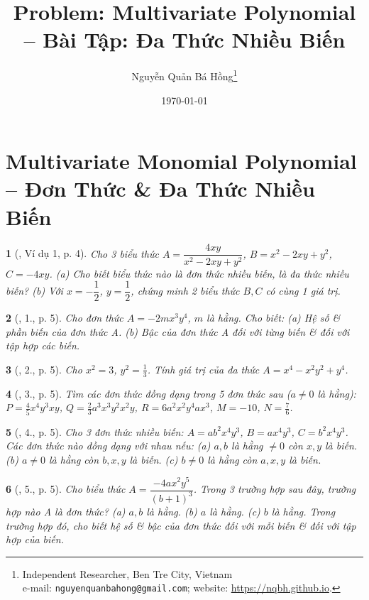 \documentclass{article}
\title{Problem: Multivariate Polynomial -- Bài Tập: Đa Thức Nhiều Biến}
\author{Nguyễn Quản Bá Hồng\footnote{Independent Researcher, Ben Tre City, Vietnam\\e-mail: \texttt{nguyenquanbahong@gmail.com}; website: \url{https://nqbh.github.io}.}}
\date{\today}
\newtheorem{baitoan}{}
\begin{document}
\maketitle
\tableofcontents


\section{Multivariate Monomial Polynomial -- Đơn Thức \& Đa Thức Nhiều Biến}

\begin{baitoan}[\cite{Tuyen_Toan_8}, Ví dụ 1, p. 4]
	Cho 3 biểu thức $A = \dfrac{4xy}{x^2 - 2xy + y^2}$, $B = x^2 - 2xy + y^2$, $C = -4xy$. (a) Cho biết biểu thức nào là đơn thức nhiều biến, là đa thức nhiều biến? (b) Với $x = -\dfrac{1}{2}$, $y = \dfrac{1}{2}$, chứng minh 2 biểu thức $B,C$ có cùng 1 giá trị.
\end{baitoan}

\begin{baitoan}[\cite{Tuyen_Toan_8}, 1., p. 5]
	Cho đơn thức $A = -2mx^3y^4$, $m$ là hằng. Cho biết: (a) Hệ số \& phần biến của đơn thức A. (b) Bậc của đơn thức A đối với từng biến \& đối với tập hợp các biến.
\end{baitoan}

\begin{baitoan}[\cite{Tuyen_Toan_8}, 2., p. 5]
	Cho $x^2 = 3$, $y^2 = \frac{1}{3}$. Tính giá trị của đa thức $A = x^4 - x^2y^2 + y^4$.
\end{baitoan}

\begin{baitoan}[\cite{Tuyen_Toan_8}, 3., p. 5]
	Tìm các đơn thức đồng dạng trong 5 đơn thức sau ($a\ne0$ là hằng): $P = \frac{4}{5}x^4y^3xy$, $Q = \frac{2}{3}a^3x^3y^2x^2y$, $R = 6a^2x^2y^4ax^3$, $M = -10$, $N = \frac{7}{6}$.
\end{baitoan}

\begin{baitoan}[\cite{Tuyen_Toan_8}, 4., p. 5]
	Cho 3 đơn thức nhiều biến: $A = ab^2x^4y^3$, $B = ax^4y^3$, $C = b^2x^4y^3$. Các đơn thức nào đồng dạng với nhau nếu: (a) $a,b$ là hằng $\ne0$ còn $x,y$ là biến. (b) $a\ne0$ là hằng còn $b,x,y$ là biến. (c) $b\ne0$ là hằng còn $a,x,y$ là biến.
\end{baitoan}

\begin{baitoan}[\cite{Tuyen_Toan_8}, 5., p. 5]
	Cho biểu thức $A = \dfrac{-4ax^2y^5}{(b + 1)^3}$. Trong 3 trường hợp sau đây, trường hợp nào A là đơn thức? (a) $a,b$ là hằng. (b) $a$ là hằng. (c) $b$ là hằng. Trong trường hợp đó, cho biết hệ số \& bậc của đơn thức đối với mỗi biến \& đối với tập hợp của biến.
\end{baitoan}
\end{document}
